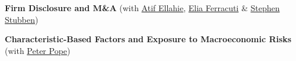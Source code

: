 \begin{paperlist}[resume]
  \item \textbf{Firm Disclosure and M\&A} (with \href{https://atifellahie.com/}{Atif Ellahie}, \href{https://sites.google.com/view/eliaferracuti/home}{Elia Ferracuti} \& \href{https://eccles.utah.edu/team/stephen-stubben/}{Stephen Stubben})
  \item \textbf{Characteristic-Based Factors and Exposure to Macroeconomic Risks} (with \href{https://www.lse.ac.uk/accounting/people/peter-pope}{Peter Pope})
\end{paperlist}
